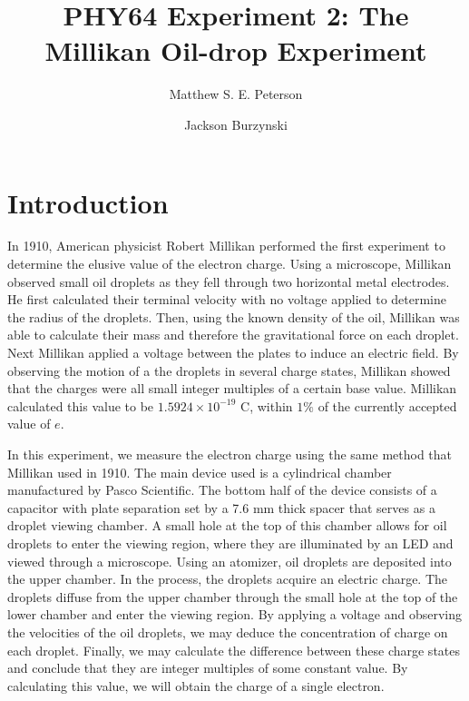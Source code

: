 \documentclass[aps, reprint,amsmath,amssymb]{revtex4-1} %
\begin{document}
\title{PHY64 Experiment 2: The Millikan Oil-drop Experiment}
\author{Matthew S. E. Peterson}
\author{Jackson Burzynski}
\maketitle

\section{Introduction}

In 1910, American physicist Robert Millikan performed the first experiment to determine the elusive value of the electron charge. Using a microscope, Millikan observed small oil droplets as they fell through two horizontal metal electrodes. He first calculated their terminal velocity with no voltage applied to determine the radius of the droplets. Then, using the known density of the oil, Millikan was able to calculate their mass and therefore the gravitational force on each droplet. Next Millikan applied a voltage between the plates to induce an electric field. By observing the motion of a the droplets in several charge states, Millikan showed that the charges were all small integer multiples of a certain base value. Millikan calculated this value to be $1.5924 \times 10^{-19}$ C, within $1\%$ of the currently accepted value of $e$. 

In this experiment, we measure the electron charge using the same method that Millikan used in 1910. The main device used is a cylindrical chamber manufactured by Pasco Scientific. The bottom half of the device consists of a capacitor with plate separation set by a 7.6 mm thick spacer that serves as a droplet viewing chamber. A small hole at the top of this chamber allows for oil droplets to enter the viewing region, where they are illuminated by an LED and viewed through a microscope. Using an atomizer, oil droplets are deposited into the upper chamber. In the process, the droplets acquire an electric charge. The droplets diffuse from the upper chamber through the small hole at the top of the lower chamber and enter the viewing region. By applying a voltage and observing the velocities of the oil droplets, we may deduce the concentration of charge on each droplet. Finally, we may calculate the difference between these charge states and conclude that they are integer multiples of some constant value. By calculating this value, we will obtain the charge of a single electron.
\end{document}
